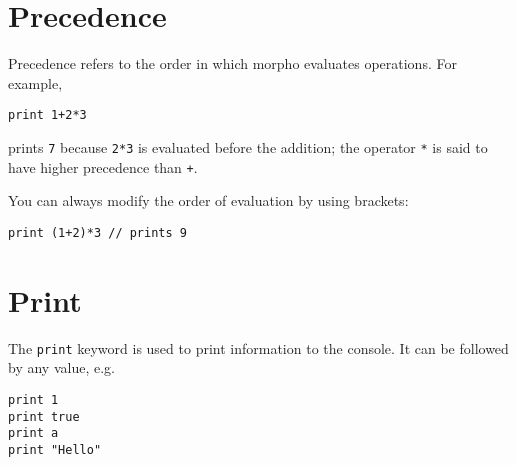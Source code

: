 \hypertarget{precedence}{%
\section{Precedence}\label{precedence}}

Precedence refers to the order in which morpho evaluates operations. For
example,

\begin{lstlisting}
print 1+2*3
\end{lstlisting}

prints \texttt{7} because \texttt{2*3} is evaluated before the addition;
the operator \texttt{*} is said to have higher precedence than
\texttt{+}.

You can always modify the order of evaluation by using brackets:

\begin{lstlisting}
print (1+2)*3 // prints 9
\end{lstlisting}

\hypertarget{print}{%
\section{Print}\label{print}}

The \texttt{print} keyword is used to print information to the console.
It can be followed by any value, e.g.

\begin{lstlisting}
print 1
print true
print a
print "Hello"
\end{lstlisting}
